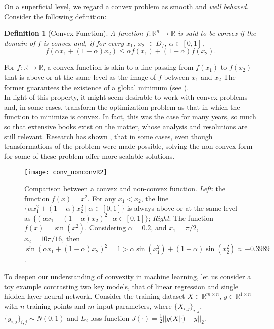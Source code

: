 \documentclass{article}
\newtheorem{definition}{Definition}
\newcommand{\rnums}{\mathbb{R}}
\begin{document}
	On a superficial level, we regard a convex problem as smooth and \textit{well behaved}. Consider the following definition:
	
	\begin{definition}[Convex Function]
		A function $f:\rnums^n \to \rnums$ is said to be convex if the domain of $f$ is convex and, if for every $x_1$, $x_2$ $\in D_{f}$, $\alpha \in [0, 1]$,
		\begin{equation}
 			f(\alpha x_1 + (1-\alpha)x_2) \leq \alpha f(x_1) + (1 - \alpha) f(x_2).
		\end{equation}
	\end{definition}
	
	For $f: \rnums \to \rnums$, a convex function is akin to a line passing from $f(x_1)$ to $f(x_2)$ that is above or at the same level as the image of $f$ between $x_1$ and $x_2$ The former guarantees the existence of a global minimum (see \cite{boyd}).\\
	
	In light of this property, it might seem desirable to work with convex problems and, in some cases, transform the optimization problem as that in which the function to minimize is convex. In fact, this was the case for many years, so much so that extensive books exist on the matter, whose analysis and resolutions are still relevant. Research has shown \cite{Jain-Kar}, that in some cases, even though transformations of the problem were made possible, solving the non-convex form for some of these problem offer more scalable solutions.\\
	
	\begin{figure}
		\centering
		\texttt{[image: conv\_nonconvR2]}
		\caption{Comparison between a convex and non-convex function. \textit{Left}: the function $f(x) = x^2$. For any $x_1 < x_2$, the line $\{\alpha x_1^2  + (1 - \alpha) x_2^2 \ | \ \alpha \in [0,1]\}$ is always above or at the same level as $\{(\alpha x_1  + (1 - \alpha) x_2)^2 \ | \ \alpha \in [0,1]\}$; \textit{Right}: The function $f(x) = \sin(x^2)$. Considering $\alpha = 0.2$, and $x_1 = \pi / 2$, $x_2 = 10 \pi / 16$, then $\sin(\alpha x_1 + (1 - \alpha) x_2)^2 = 1 > \alpha \sin(x_1 ^ 2) + (1 - \alpha) \sin(x_2^2) \approx -0.3989$.}
		\label{fig:conv_nonconvr2}
	\end{figure}
		
	To deepen our understanding of convexity in machine learning, let us consider a toy example contrasting two key models, that of linear regression and single hidden-layer neural network. Consider the training dataset $X\in\rnums^{m\times n}$, $y\in\rnums^{1\times n}$ with $n$ training points and $m$ input parameters, where $\{X_{i,j}\}_{i,j}$, $\{y_{i,j}\}_{i,j} \sim N(0,1)$ and $L_2$ loss function $J(\cdot) = \frac{1}{2} ||g(X|\cdot) - y||_2$.\\
		
\end{document}
